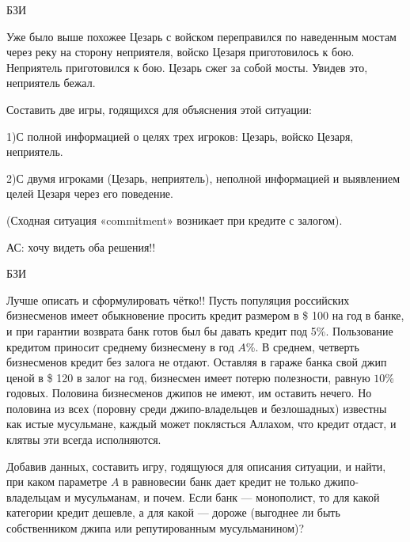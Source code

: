 \begin{problem} 
\begin{source}
БЗИ
\end{source}
{\red Уже было выше похожее}
Цезарь с войском
переправился по наведенным мостам через реку на сторону
неприятеля, войско Цезаря приготовилось к бою. Неприятель
приготовился к бою. Цезарь сжег за собой мосты. Увидев это,
неприятель бежал.

Составить две игры, годящихся для объяснения этой ситуации:

1)С полной информацией о целях трех игроков: Цезарь, войско
Цезаря, неприятель.

2)С двумя игроками (Цезарь,
неприятель), неполной информацией и выявлением целей Цезаря
через его поведение.

(Сходная ситуация «commitment» возникает при кредите с
залогом).

{\red АС: хочу видеть оба решения!!}

\begin{sol}

\end{sol}
\end{problem}




\begin{problem}\begin{source}
БЗИ
\end{source}
{\red Лучше описать и сформулировать чётко!!}
Пусть популяция российских бизнесменов имеет обыкновение
просить кредит размером в \$ 100 на год в банке, и при
гарантии возврата банк готов был бы давать кредит под 5\%.
Пользование кредитом приносит среднему бизнесмену в год
$A$\%. В среднем, четверть бизнесменов кредит без залога не
отдают. Оставляя в гараже банка свой джип ценой в \$ 120  в
залог на год, бизнесмен имеет потерю полезности, равную
$10$\% годовых. Половина бизнесменов джипов не имеют, им
оставить нечего. Но половина из всех (поровну среди
джипо-владельцев и безлошадных) известны как истые
мусульмане, каждый может поклясться Аллахом, что кредит
отдаст, и клятвы эти всегда исполняются.

Добавив данных, составить игру, годящуюся для описания ситуации, и
найти, при каком параметре $A$ в равновесии банк дает
кредит не только джипо-владельцам и мусульманам, и почем.
Если банк — монополист, то для какой категории кредит
дешевле, а для какой — дороже (выгоднее ли быть собственником
джипа или репутированным мусульманином)?

\begin{sol}

\end{sol}
\end{problem}



